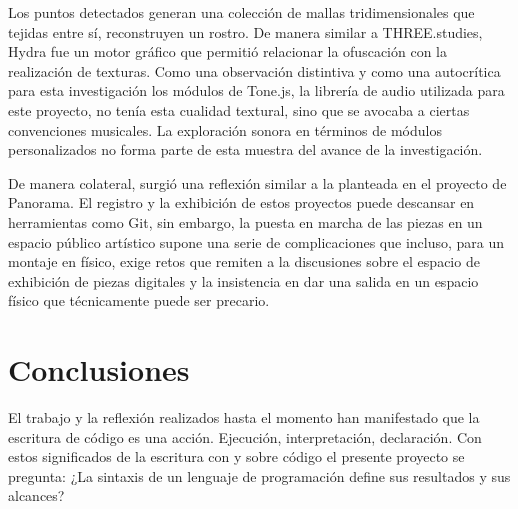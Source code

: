 \documentclass[12pt,letterpaper, twoside, openright,
headinclude,footinclude,BCOR5mm,
numbers=noenddot,cleardoublepage=empty,
tablecaptionabove]{article}
\begin{document}

Los puntos detectados generan una colección de mallas tridimensionales que tejidas entre sí, reconstruyen un rostro. De manera similar a THREE.studies, Hydra fue un motor gráfico que permitió relacionar la ofuscación con la realización de texturas. Como una observación distintiva y como una autocrítica para esta investigación los módulos de Tone.js, la librería de audio utilizada para este proyecto, no tenía esta cualidad textural, sino que se avocaba a ciertas convenciones musicales. La exploración sonora en términos de módulos personalizados no forma parte de esta muestra del avance de la investigación.


De manera colateral, surgió una reflexión similar a la planteada en el proyecto de Panorama. El registro y la exhibición de estos proyectos puede descansar en herramientas como Git, sin embargo, la puesta en marcha de las piezas en un espacio público artístico supone una serie de complicaciones que incluso, para un montaje en físico, exige retos que remiten a la discusiones sobre el espacio de exhibición de piezas digitales y la insistencia en dar una salida en un espacio físico que técnicamente puede ser precario. %

\newpage








\section*{Conclusiones} %


El trabajo y la reflexión realizados hasta el momento han manifestado que la escritura de código es una acción. Ejecución, interpretación, declaración. Con estos significados de la escritura con y sobre código el presente proyecto se pregunta: ¿La sintaxis de un lenguaje de programación define sus resultados y sus alcances? %
\end{document}
